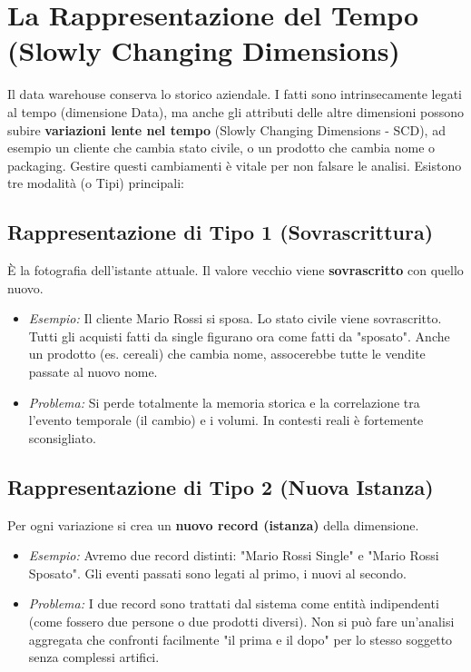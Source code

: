 \section{La Rappresentazione del Tempo (Slowly Changing Dimensions)}

Il data warehouse conserva lo storico aziendale. I fatti sono intrinsecamente legati al tempo (dimensione Data), ma anche gli attributi delle altre dimensioni possono subire \textbf{variazioni lente nel tempo} (Slowly Changing Dimensions - SCD), ad esempio un cliente che cambia stato civile, o un prodotto che cambia nome o packaging.
Gestire questi cambiamenti è vitale per non falsare le analisi. Esistono tre modalità (o Tipi) principali:

\subsection{Rappresentazione di Tipo 1 (Sovrascrittura)}
È la fotografia dell'istante attuale. Il valore vecchio viene \textbf{sovrascritto} con quello nuovo.
\begin{itemize}
    \item \textit{Esempio:} Il cliente Mario Rossi si sposa. Lo stato civile viene sovrascritto. Tutti gli acquisti fatti da single figurano ora come fatti da "sposato". Anche un prodotto (es. cereali) che cambia nome, assocerebbe tutte le vendite passate al nuovo nome.
    \item \textit{Problema:} Si perde totalmente la memoria storica e la correlazione tra l'evento temporale (il cambio) e i volumi. In contesti reali è fortemente sconsigliato.
\end{itemize}

\subsection{Rappresentazione di Tipo 2 (Nuova Istanza)}
Per ogni variazione si crea un \textbf{nuovo record (istanza)} della dimensione.
\begin{itemize}
    \item \textit{Esempio:} Avremo due record distinti: "Mario Rossi Single" e "Mario Rossi Sposato". Gli eventi passati sono legati al primo, i nuovi al secondo.
    \item \textit{Problema:} I due record sono trattati dal sistema come entità indipendenti (come fossero due persone o due prodotti diversi). Non si può fare un'analisi aggregata che confronti facilmente "il prima e il dopo" per lo stesso soggetto senza complessi artifici.
\end{itemize}

